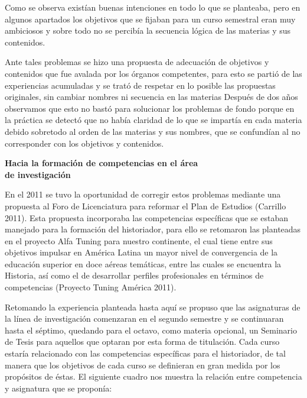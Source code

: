 Como se observa existían buenas intenciones en todo lo que se 
planteaba, pero en algunos apartados los objetivos que se fijaban para 
un curso semestral eran muy ambiciosos y sobre todo no se percibía la 
secuencia lógica de las materias y sus contenidos.

Ante tales problemas se hizo una propuesta de adecuación de objetivos y 
contenidos que fue avalada por los órganos competentes, para esto se 
partió de las experiencias acumuladas y se trató de respetar en lo 
posible las propuestas originales, sin cambiar nombres ni secuencia en 
las materias Después de dos años observamos que esto no bastó para 
solucionar los problemas de fondo porque en la práctica se detectó que 
no había claridad de lo que se impartía en cada materia debido 
sobretodo al orden de las materias y sus nombres, que se confundían al 
no corresponder con los objetivos y contenidos.

{\bfseries Hacia la formación de competencias en el área\\ de investigación}
\enlargethispage{2\baselineskip}

En el 2011 se tuvo la oportunidad de corregir estos problemas mediante 
una propuesta al Foro de Licenciatura para reformar el Plan de Estudios 
(Carrillo 2011). Esta propuesta incorporaba las competencias 
específicas que se estaban manejado para la formación del historiador, 
para ello se retomaron las planteadas en el proyecto Alfa Tuning para 
nuestro continente, el cual tiene entre sus objetivos impulsar en 
América Latina un mayor nivel de convergencia de la educación superior 
en doce aéreas temáticas, entre las cuales se encuentra la Historia, 
así como el de desarrollar perfiles profesionales en términos de 
competencias (Proyecto Tuning América 2011).

Retomando la experiencia planteada hasta aquí se propuso que las 
asignaturas de la línea de investigación comenzaran en el segundo 
semestre y se continuaran hasta el séptimo, quedando para el octavo, 
como materia opcional, un Seminario de Tesis para aquellos que optaran 
por esta forma de titulación. Cada curso estaría relacionado con las 
competencias específicas para el historiador, de tal manera que los 
objetivos de cada curso se definieran en gran medida por los propósitos 
de éstas. El siguiente cuadro nos muestra la relación entre competencia 
y asignatura que se proponía:


